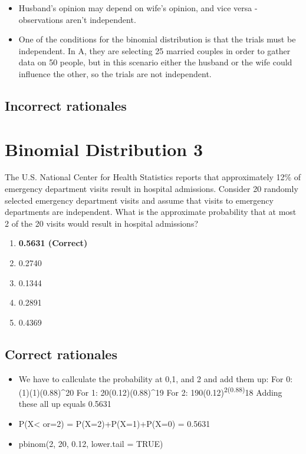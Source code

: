 \documentclass[letterpaper,9pt,twoside,printwatermark=false]{pinp}
\providecommand{\tightlist}{%
  \setlength{\itemsep}{0pt}\setlength{\parskip}{0pt}}
\begin{document}
\begin{itemize}
\tightlist
\item
  Husband's opinion may depend on wife's opinion, and vice versa -
  observations aren't independent.
\item
  One of the conditions for the binomial distribution is that the trials
  must be independent. In A, they are selecting 25 married couples in
  order to gather data on 50 people, but in this scenario either the
  husband or the wife could influence the other, so the trials are not
  independent.
\end{itemize}

\hypertarget{incorrect-rationales-8}{%
\subsection{Incorrect rationales}\label{incorrect-rationales-8}}

\hypertarget{binomial-distribution-3}{%
\section{Binomial Distribution 3}\label{binomial-distribution-3}}

The U.S. National Center for Health Statistics reports that
approximately 12\% of emergency department visits result in hospital
admissions. Consider 20 randomly selected emergency department visits
and assume that visits to emergency departments are independent. What is
the approximate probability that at most 2 of the 20 visits would result
in hospital admissions?

\begin{enumerate}
\def\labelenumi{\alph{enumi}.}
\tightlist
\item
  \textbf{0.5631 (Correct)}
\item
  0.2740
\item
  0.1344
\item
  0.2891
\item
  0.4369
\end{enumerate}

\hypertarget{correct-rationales-9}{%
\subsection{Correct rationales}\label{correct-rationales-9}}

\begin{itemize}
\tightlist
\item
  We have to callculate the probability at 0,1, and 2 and add them up:
  For 0: (1)(1)(0.88)\^{}20 For 1: 20(0.12)(0.88)\^{}19 For 2:
  190(0.12)\textsuperscript{2(0.88)}18 Adding these all up equals 0.5631
\item
  P(X\textless{} or=2) = P(X=2)+P(X=1)+P(X=0) = 0.5631
\item
  pbinom(2, 20, 0.12, lower.tail = TRUE)
\end{itemize}
\end{document}
